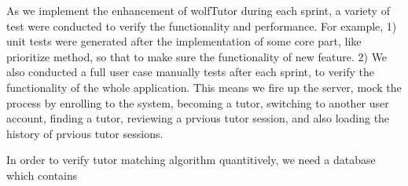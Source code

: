 As we implement the enhancement of wolfTutor during each sprint, 
a variety of test were conducted to verify the functionality and performance. 
For example, 1) unit tests were generated after the implementation of some 
core part, like prioritize method, so that to make sure the functionality of
 new feature. 2) We also conducted a full user case manually tests after 
 each sprint, to verify the functionality of the whole application. This
  means we fire up the server, mock the process by enrolling to the system, 
  becoming a tutor, switching to another user account, finding a tutor, 
  reviewing a prvious tutor session, and also loading the history of prvious tutor sessions.

In order to verify tutor matching algorithm quantitively, we need a database which contains  
